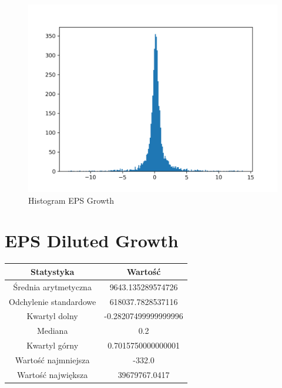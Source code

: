 \documentclass{article}
\begin{document}
\begin{figure}[h!]
    \includegraphics[width=\linewidth]{variables/EPS Growth.png}
    \caption{Histogram EPS Growth }
\end{figure}\section{ EPS Diluted Growth }

\begin{center}
    \begin{tabular}{|c | c|} 
    \hline
    Statystyka & Wartość \\
    \hline\hline
    Średnia arytmetyczna & 9643.135289574726 \\ 
    \hline
    Odchylenie standardowe & 618037.7828537116 \\
    \hline
    Kwartyl dolny & -0.28207499999999996 \\
    \hline
    Mediana & 0.2 \\
    \hline
    Kwartyl górny & 0.7015750000000001 \\
    \hline
    Wartość najmniejsza & -332.0 \\
    \hline
    Wartość największa & 39679767.0417 \\
    \hline
   \end{tabular}
\end{center}
\end{document}
